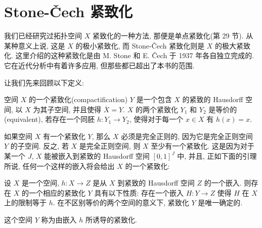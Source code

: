 \documentclass[../../main.tex]{subfiles}
\begin{document}
\section{Stone-Čech 紧致化}\label{section:ch05-stone-cech}

我们已经研究过拓扑空间 $X$ 紧致化的一种方法, 那便是单点紧致化(第 29 节). 从某种意义上说, 这是 $X$ 的极小紧致化, 而 Stone-Čech 紧致化则是 $X$ 的极大紧致化. 这里介绍的这种紧致化是由 M. Stone 和 E. Čech 于 1937 年各自独立完成的. 它在近代分析中有着许多应用, 但那些都已超出了本书的范围.

让我们先来回顾以下定义:

\begin{definition}\label{definition:ch05-compactification}
空间 $X$ 的一个紧致化(compactification) $Y$ 是一个包含 $X$ 的紧致的 Hausdorff 空间, 以 $X$ 为其子空间, 并且使得 $\overline{X}=Y$. $X$ 的两个紧致化 $Y_1$ 和 $Y_2$ 是等价的(equivalent), 若存在一个同胚 $h\colon Y_1\to Y_2$, 使得对于每一个 $x\in X$ 有 $h(x)=x$.
\end{definition}

如果空间 $X$ 有一个紧致化 $Y$, 那么 $X$ 必须是完全正则的, 因为它是完全正则空间 $Y$ 的子空间. 反之, 若 $X$ 是完全正则空间, 则 $X$ 至少有一个紧致化. 这是因为对于某一个 $J$, $X$ 能被嵌入到紧致的 Hausdorff 空间 $[0,1]^J$ 中, 并且, 正如下面的引理所说, 任何一个这样的嵌入将会给出 $X$ 的一个紧致化:

\begin{lemma}\label{lemma:ch05-induced-compactification}
设 $X$ 是一个空间, $h\colon X\to Z$ 是从 $X$ 到紧致的 Hausdorff 空间 $Z$ 的一个嵌入. 则存在 $X$ 的一个相应的紧致化 $Y$ 具有以下性质: 存在一个嵌入 $H\colon Y\to Z$ 使得 $H$ 在 $X$ 上的限制等于 $h$. 在不区别等价的两个空间的意义下, 紧致化 $Y$ 是唯一确定的.
\end{lemma}

这个空间 $Y$ 称为由嵌入 $h$ 所诱导的紧致化.
\end{document}
